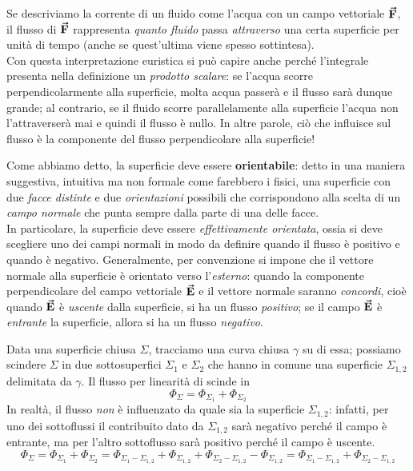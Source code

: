\begin{intuit}
	Se descriviamo la corrente di un fluido come l'acqua con un campo vettoriale $\vb*{\va{F}}$, il flusso di $\vb*{\va{F}}$ rappresenta \textit{quanto fluido} passa \textit{attraverso} una certa superficie per unità di tempo (anche se quest'ultima viene spesso sottintesa).\\
	Con questa interpretazione euristica si può capire anche perché l'integrale presenta nella definizione un \textit{prodotto scalare}: se l'acqua scorre perpendicolarmente alla superficie, molta acqua passerà e il flusso sarà dunque grande; al contrario, se il fluido scorre parallelamente alla superficie l'acqua non l'attraverserà mai e quindi il flusso è nullo. In altre parole, ciò che influisce sul flusso è la componente del flusso perpendicolare alla superficie!
\end{intuit}
\noindent Come abbiamo detto, la superficie deve essere \textbf{orientabile}: detto in una maniera suggestiva, intuitiva ma non formale come farebbero i fisici, una superficie con due \textit{facce distinte} e due \textit{orientazioni} possibili che corrispondono alla scelta di un \textit{campo normale} che punta sempre dalla parte di una delle facce.\\
In particolare, la superficie deve essere \textit{effettivamente orientata}, ossia si deve scegliere uno dei campi normali in modo da definire quando il flusso è positivo e quando è negativo. Generalmente, per convenzione si impone che il vettore normale alla superficie è orientato verso l'\textit{esterno}: quando la componente perpendicolare del campo vettoriale $\vb*{\va{E}}$ e il vettore normale saranno \textit{concordi}, cioè quando $\vb*{\va{E}}$ è \textit{uscente} dalla superficie, si ha un flusso \textit{positivo}; se il campo $\vb*{\va{E}}$ è \textit{entrante} la superficie, allora si ha un flusso \textit{negativo}.
\begin{observe}%
	Data una superficie chiusa $\Sigma$, tracciamo una curva chiusa $\gamma$ su di essa; possiamo scindere $\Sigma$ in due sottosuperfici $\Sigma_1$ e $\Sigma_2$ che hanno in comune una superficie $\Sigma_{1,2}$ delimitata da $\gamma$.
	Il flusso per linearità di scinde in
	\begin{equation*}
		\Phi_{\Sigma}=\Phi_{\Sigma_1}+\Phi_{\Sigma_2}
	\end{equation*}
	In realtà, il flusso \textit{non} è influenzato da quale sia la superficie  $\Sigma_{1,2}$: infatti, per uno dei sottoflussi il contribuito dato da $ \Sigma_{1,2}$ sarà negativo perché il campo è entrante, ma per l'altro sottoflusso sarà positivo perché il campo è uscente.
	\begin{equation*}
		\Phi_{\Sigma}=\Phi_{\Sigma_1}+\Phi_{\Sigma_2}=\Phi_{\Sigma_1-\Sigma_{1,2}}+\Phi_{\Sigma_{1,2}}+\Phi_{\Sigma_2-\Sigma_{1,2}}-\Phi_{\Sigma_{1,2}}=\Phi_{\Sigma_1-\Sigma_{1,2}}+\Phi_{\Sigma_2-\Sigma_{1,2}}
	\end{equation*}
\end{observe}
